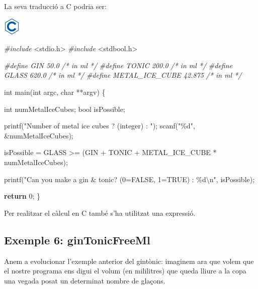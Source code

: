 \documentclass[]{book}
\newenvironment{Shaded}{\begin{snugshade}}{\end{snugshade}}
\newcommand{\CommentTok}[1]{\textcolor[rgb]{0.56,0.35,0.01}{\textit{#1}}}
\newcommand{\ControlFlowTok}[1]{\textcolor[rgb]{0.13,0.29,0.53}{\textbf{#1}}}
\newcommand{\DataTypeTok}[1]{\textcolor[rgb]{0.13,0.29,0.53}{#1}}
\newcommand{\DecValTok}[1]{\textcolor[rgb]{0.00,0.00,0.81}{#1}}
\newcommand{\ImportTok}[1]{#1}
\newcommand{\NormalTok}[1]{#1}
\newcommand{\PreprocessorTok}[1]{\textcolor[rgb]{0.56,0.35,0.01}{\textit{#1}}}
\newcommand{\SpecialCharTok}[1]{\textcolor[rgb]{0.00,0.00,0.00}{#1}}
\newcommand{\StringTok}[1]{\textcolor[rgb]{0.31,0.60,0.02}{#1}}
\begin{document}
La seva traducció a C podria ser:

\includegraphics{./img/c.png}

\begin{Shaded}
\begin{Highlighting}[]
\PreprocessorTok{\#include }\ImportTok{\textless{}stdio.h\textgreater{}}
\PreprocessorTok{\#include }\ImportTok{\textless{}stdbool.h\textgreater{}}

\PreprocessorTok{\#define GIN 50.0              }\CommentTok{/* in ml */}
\PreprocessorTok{\#define TONIC 200.0           }\CommentTok{/* in ml */}
\PreprocessorTok{\#define GLASS 620.0           }\CommentTok{/* in ml */}
\PreprocessorTok{\#define METAL\_ICE\_CUBE 42.875 }\CommentTok{/* in ml */}\PreprocessorTok{ }

\DataTypeTok{int}\NormalTok{ main(}\DataTypeTok{int}\NormalTok{ argc, }\DataTypeTok{char}\NormalTok{ **argv) \{}

    \DataTypeTok{int}\NormalTok{ numMetalIceCubes;}
    \DataTypeTok{bool}\NormalTok{ isPossible;}

\NormalTok{    printf(}\StringTok{"Number of metal ice cubes ? (integer) : "}\NormalTok{);}
\NormalTok{    scanf(}\StringTok{"\%d"}\NormalTok{, \&numMetalIceCubes);}

\NormalTok{    isPossible = GLASS \textgreater{}= (GIN + TONIC + METAL\_ICE\_CUBE * numMetalIceCubes);}

\NormalTok{    printf(}\StringTok{"Can you make a gin \& tonic? (0=FALSE, 1=TRUE) : \%d}\SpecialCharTok{\textbackslash{}n}\StringTok{"}\NormalTok{, isPossible);}
    
    \ControlFlowTok{return} \DecValTok{0}\NormalTok{;}
\NormalTok{\}}
\end{Highlighting}
\end{Shaded}

Per realitzar el càlcul en C també s'ha utilitzat una expressió.

\hypertarget{exemple-6-gintonicfreeml}{%
\subsection{Exemple 6: ginTonicFreeMl}\label{exemple-6-gintonicfreeml}}

Anem a evolucionar l'exemple anterior del gintònic: imaginem ara que volem que el nostre programa ens digui el volum (en mililitres) que queda lliure a la copa una vegada posat un determinat nombre de glaçons.
\end{document}
